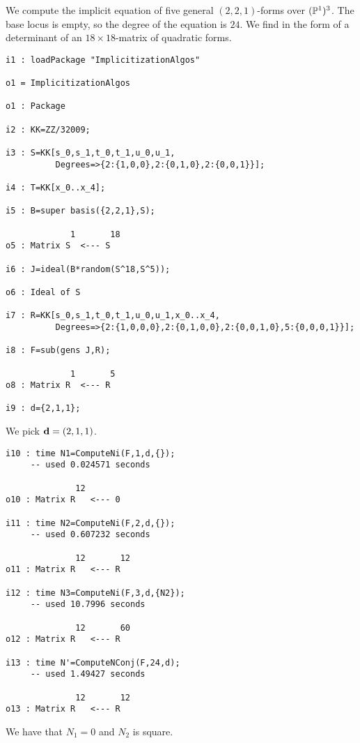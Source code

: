 \documentclass[fleqn,reqno]{amsart}
\numberwithin{first}{chapter}
\begin{document}
\begin{example}[$\mt{ex602}$]
\label{ex602}
We compute the implicit equation of five general $(2,2,1)$-forms over $(\mathbb{P}^1)^3$.
The base locus is empty, so the degree of the equation is $24$.
We find in the form of a determinant of an $18\times18$-matrix of quadratic forms.

\begin{verbatim}
i1 : loadPackage "ImplicitizationAlgos"

o1 = ImplicitizationAlgos

o1 : Package

i2 : KK=ZZ/32009;

i3 : S=KK[s_0,s_1,t_0,t_1,u_0,u_1,
          Degrees=>{2:{1,0,0},2:{0,1,0},2:{0,0,1}}];

i4 : T=KK[x_0..x_4];

i5 : B=super basis({2,2,1},S);

             1       18
o5 : Matrix S  <--- S

i6 : J=ideal(B*random(S^18,S^5));

o6 : Ideal of S

i7 : R=KK[s_0,s_1,t_0,t_1,u_0,u_1,x_0..x_4,
          Degrees=>{2:{1,0,0,0},2:{0,1,0,0},2:{0,0,1,0},5:{0,0,0,1}}];

i8 : F=sub(gens J,R);

             1       5
o8 : Matrix R  <--- R

i9 : d={2,1,1};
\end{verbatim}
We pick $\mathbf d=(2,1,1)$.

\begin{verbatim}
i10 : time N1=ComputeNi(F,1,d,{});
     -- used 0.024571 seconds

              12
o10 : Matrix R   <--- 0

i11 : time N2=ComputeNi(F,2,d,{});
     -- used 0.607232 seconds

              12       12
o11 : Matrix R   <--- R

i12 : time N3=ComputeNi(F,3,d,{N2});
     -- used 10.7996 seconds

              12       60
o12 : Matrix R   <--- R

i13 : time N'=ComputeNConj(F,24,d);
     -- used 1.49427 seconds

              12       12
o13 : Matrix R   <--- R
\end{verbatim}
We have that $N_1=0$ and $N_2$ is square.
\end{example}
\end{document}
